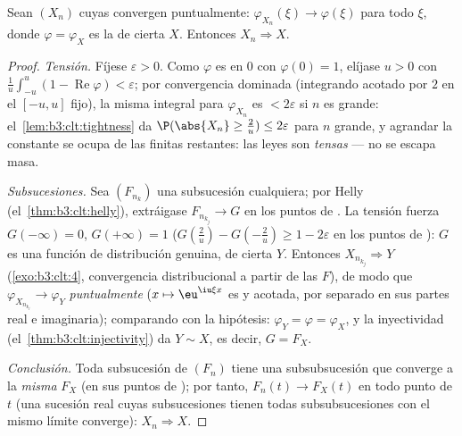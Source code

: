 \begin{theorem}
\label{thm:b3:clt:levy}
Sean $(X_n)$ 
cuyas  convergen
puntualmente: $\varphi_{X_n}(\xi) \to
\varphi(\xi)$ para todo $\xi$, donde $\varphi =
\varphi_X$ es la  de
cierta  $X$.
Entonces $X_n \Rightarrow X$.
\end{theorem}

\begin{proof}
\emph{Tensión.} Fíjese $\varepsilon > 0$. Como $\varphi$ es
 en $0$ con
$\varphi(0) = 1$, elíjase $u > 0$ con
$\frac1u\int_{-u}^u(1 - \operatorname{Re}\varphi) <
\varepsilon$; por convergencia dominada (integrando acotado por $2$ en
el $[-u,u]$ fijo), la misma integral para $\varphi_{X_n}$ es
$< 2\varepsilon$ si $n$ es grande: el~\cref{lem:b3:clt:tightness} da
$\P(\abs{X_n} \geq \frac2u)
\leq 2\varepsilon$ para $n$ grande, y agrandar la constante se ocupa de
las finitas restantes: las leyes son \emph{tensas} --- no se escapa
masa.

\emph{Subsucesiones.} Sea $(F_{n_k})$ una subsucesión cualquiera; por
Helly (el~\cref{thm:b3:clt:helly}), extráigase $F_{n_{k_j}} \to G$ en
los puntos de . La
tensión fuerza $G(-\infty) = 0$, $G(+\infty) = 1$
($G(\frac2u) - G(-\frac2u) \geq 1 -
2\varepsilon$ en los puntos de
): $G$ es una función de
distribución genuina, de cierta
 $Y$. Entonces
$X_{n_{k_j}} \Rightarrow Y$ (\cref{exo:b3:clt:4},
convergencia distribucional a partir de las $F$), de modo que
$\varphi_{X_{n_{k_j}}} \to \varphi_Y$ \emph{puntualmente} ($x
\mapsto \eu^{\iu\xi x}$ es 
y acotada, por separado en sus partes real e imaginaria); comparando con
la hipótesis: $\varphi_Y = \varphi = \varphi_X$, y la inyectividad
(el~\cref{thm:b3:clt:injectivity}) da $Y \sim X$, es decir, $G =
F_X$.

\emph{Conclusión.} Toda subsucesión de $(F_n)$ tiene una subsubsucesión
que converge a la \emph{misma} $F_X$ (en sus puntos de
); por tanto,
$F_n(t) \to F_X(t)$ en todo punto de
 $t$ (una sucesión real
cuyas subsucesiones tienen todas subsubsucesiones con el mismo límite
converge): $X_n \Rightarrow X$.
\end{proof}

